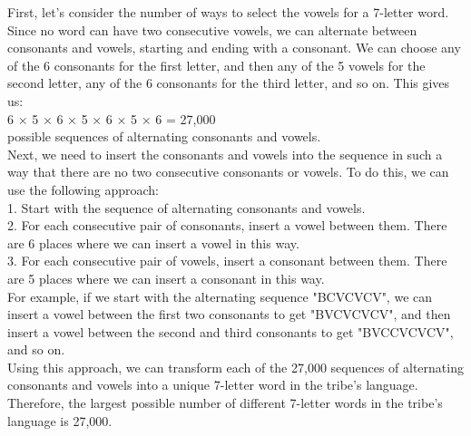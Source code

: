 \documentclass{article}
\begin{document}
First, let's consider the number of ways to select the vowels for a 7-letter word. Since no word can have two consecutive vowels, we can alternate between consonants and vowels, starting and ending with a consonant. We can choose any of the 6 consonants for the first letter, and then any of the 5 vowels for the second letter, any of the 6 consonants for the third letter, and so on. This gives us:\\

6 × 5 × 6 × 5 × 6 × 5 × 6 = 27,000\\

possible sequences of alternating consonants and vowels.\\

Next, we need to insert the consonants and vowels into the sequence in such a way that there are no two consecutive consonants or vowels. To do this, we can use the following approach:\\

1. Start with the sequence of alternating consonants and vowels.
\\

2. For each consecutive pair of consonants, insert a vowel between them. There are 6 places where we can insert a vowel in this way.
\\

3. For each consecutive pair of vowels, insert a consonant between them. There are 5 places where we can insert a consonant in this way.\\

For example, if we start with the alternating sequence "BCVCVCV", we can insert a vowel between the first two consonants to get "BVCVCVCV", and then insert a vowel between the second and third consonants to get "BVCCVCVCV", and so on.\\

Using this approach, we can transform each of the 27,000 sequences of alternating consonants and vowels into a unique 7-letter word in the tribe's language. Therefore, the largest possible number of different 7-letter words in the tribe's language is 27,000.\\
\end{document}
